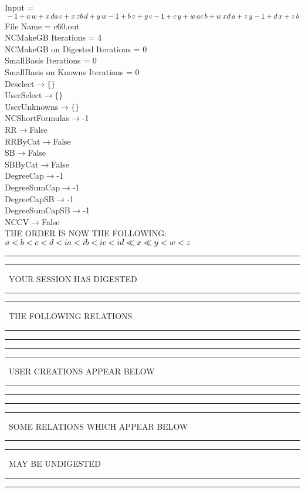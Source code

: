 \documentclass[rep10,leqno]{report}
\begin{document}
\normalsize
\baselineskip=12pt
\noindent
Input = 
$
\\-1 + a\,
 w + x\,
 d\\
a\,
 c + x\,
 z\\
b\,
 d + y\,
 w\\
-1 + b\,
 z + y\,
 c\\
-1 + c\,
 y + w\,
 a\\
c\,
 b + w\,
 x\\
d\,
 a + z\,
 y\\
-1 + d\,
 x + z\,
 b\\
$
File Name = c60.out\\
NCMakeGB Iterations = 4\\
NCMakeGB on Digested Iterations = 0\\
SmallBasis Iterations = 0\\
SmallBasis on Knowns Iterations = 0\\
Deselect$\rightarrow \{\}$\\
UserSelect$\rightarrow \{\}$\\
UserUnknowns$\rightarrow \{\}$\\
NCShortFormulas$\rightarrow$-1\\
RR$\rightarrow $False\\
RRByCat$\rightarrow $False\\
SB$\rightarrow $False\\
SBByCat$\rightarrow $False\\
DegreeCap$\rightarrow $-1\\
DegreeSumCap$\rightarrow $-1\\
DegreeCapSB$\rightarrow $-1\\
DegreeSumCapSB$\rightarrow $-1\\
NCCV$\rightarrow $False\\
THE ORDER IS NOW THE FOLLOWING:\hfil\break
$
a<b<c<d<ia<ib<ic<id\ll
x\ll
y<w<z\\
$
\rule[2pt]{6in}{4pt}\hfil\break
\rule[2pt]{1.879in}{4pt}
\ YOUR SESSION HAS DIGESTED\ 
\rule[2pt]{1.879in}{4pt}\hfil\break
\rule[2pt]{1.923in}{4pt}
\ THE FOLLOWING RELATIONS\ 
\rule[2pt]{1.923in}{4pt}\hfil\break
\rule[2pt]{6in}{4pt}\hfil\break
\rule[2pt]{6in}{1pt}\hfil\break
\rule[2.5pt]{1.701in}{1pt}
\ USER CREATIONS APPEAR BELOW\ 
\rule[2.5pt]{1.701in}{1pt}\hfil\break
\rule[2pt]{6in}{1pt}\hfil\break
\rule[2pt]{6in}{4pt}\hfil\break
\rule[2pt]{1.45in}{4pt}
\ SOME RELATIONS WHICH APPEAR BELOW\ 
\rule[2pt]{1.45in}{4pt}\hfil\break
\rule[2pt]{2.18in}{4pt}
\ MAY BE UNDIGESTED\ 
\rule[2pt]{2.18in}{4pt}\hfil\break
\rule[2pt]{6in}{4pt}\hfil\break
\end{document}
